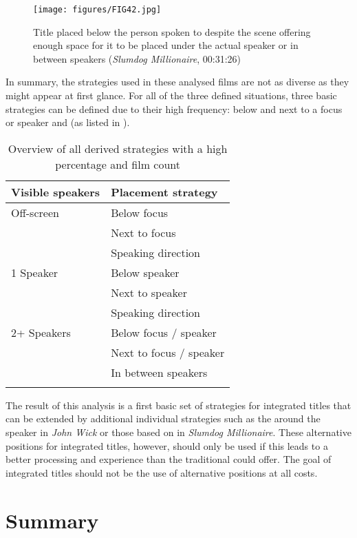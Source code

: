 \begin{figure}
\texttt{[image: figures/FIG42.jpg]}
\caption{Title placed below the person spoken to despite the scene offering enough space for it to be placed under the actual speaker or in between speakers (\textit{Slumdog Millionaire}, 00:31:26)}
\label{fig:FIG42}
\end{figure}

In summary, the  strategies used in these analysed films are not as diverse as they might appear at first glance. For all of the three defined situations, three basic strategies can be defined due to their high frequency: below and next to a focus or speaker and  (as listed in ).

\begin{table}
\begin{tabularx}{\textwidth}{XX}
\lsptoprule
 Visible speakers &  Placement strategy\\
 \midrule
 Off-screen & Below focus\\
& Next to focus\\
& Speaking direction\\
 1 Speaker & Below speaker\\
& Next to speaker\\
& Speaking direction\\
 2+ Speakers & Below focus / speaker\\
& Next to focus / speaker\\
& In between speakers\\
\lspbottomrule
\end{tabularx}
\caption{Overview of all derived strategies with a high percentage and film count}
\label{tab:TAB12}
\end{table}

The result of this analysis is a first basic set of  strategies for integrated titles that can be extended by additional individual strategies such as the  around the speaker in \textit{John Wick} or those based on  in \textit{Slumdog Millionaire}. These alternative positions for integrated titles, however, should only be used if this leads to a better processing and experience than the traditional  could offer. The goal of integrated titles should not be the use of alternative positions at all costs.

\section{Summary}\label{sec:4.3}

